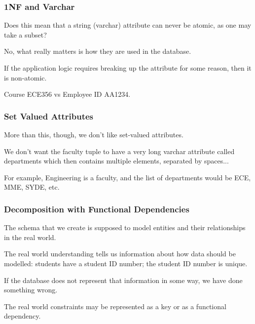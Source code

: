 \begin{frame}
\frametitle{1NF and Varchar}

Does this mean that a string (varchar) attribute can never be atomic, as one may take a subset? 

No, what really matters is how they are used in the database. 

If the application logic requires breaking up the attribute for some reason, then it is non-atomic. 

Course ECE356 vs Employee ID AA1234.

\end{frame}



\begin{frame}
\frametitle{Set Valued Attributes}

More than this, though, we don't like set-valued attributes. 

We don't want the faculty tuple to have a very long varchar attribute called departments which then contains multiple elements, separated by spaces... 

For example, Engineering is a faculty, and the list of departments would be ECE, MME, SYDE, etc. 

\end{frame}



\begin{frame}
\frametitle{Decomposition with Functional Dependencies}

The schema that we create is supposed to model entities and their relationships in the real world. 

The real world understanding tells us information about how data should be modelled: students have a student ID number; the student ID number is unique. 

If the database does not represent that information in some way, we have done something wrong. 

The real world constraints may be represented as a key or as a functional dependency.

\end{frame}

